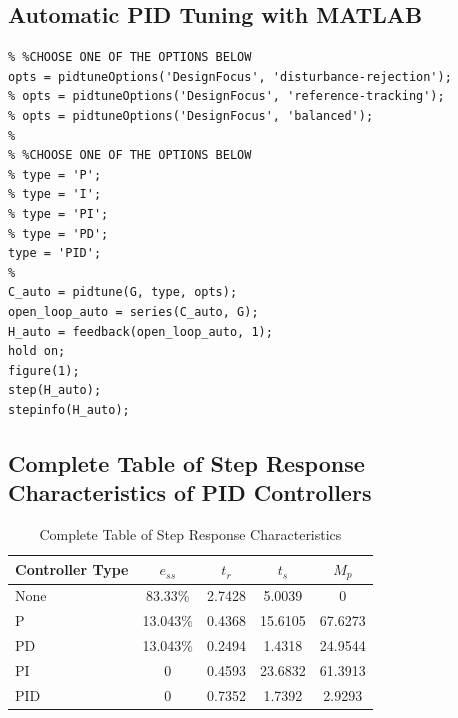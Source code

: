 \documentclass[a4paper, twocolumn, titlepage, 10pt]{article}
\begin{document}
		\subsection{Automatic PID Tuning with MATLAB}
			\begin{lstlisting}[frame=single, numbers=none]
% %%Question 2
% %CHOOSE ONE OF THE OPTIONS BELOW
opts = pidtuneOptions('DesignFocus', 'disturbance-rejection');
% opts = pidtuneOptions('DesignFocus', 'reference-tracking');
% opts = pidtuneOptions('DesignFocus', 'balanced');
% 
% %CHOOSE ONE OF THE OPTIONS BELOW
% type = 'P';
% type = 'I';
% type = 'PI';
% type = 'PD';
type = 'PID';
% 
C_auto = pidtune(G, type, opts);
open_loop_auto = series(C_auto, G);
H_auto = feedback(open_loop_auto, 1);
hold on;
figure(1);
step(H_auto);
stepinfo(H_auto);
			\end{lstlisting}
		\subsection{Complete Table of Step Response Characteristics of PID Controllers}
			\begin{table}[H]
				\centering
				\begin{tabular}{L | c c c c}
					Controller Type & $e_{ss}$ & $t_r$ & $t_s$ & $M_p$ \\
					\hline
					None & 83.33\% & 2.7428 & 5.0039 & 0\\
					P & 13.043\% & 0.4368 & 15.6105 & 67.6273\\
					PD & 13.043\% & 0.2494 & 1.4318 & 24.9544\\
					PI & 0 & 0.4593 & 23.6832 & 61.3913\\
					PID & 0 & 0.7352 & 1.7392 & 2.9293
				\end{tabular}
				\caption{Complete Table of Step Response Characteristics}
				\label{completeTable}
			\end{table}
\end{document}
